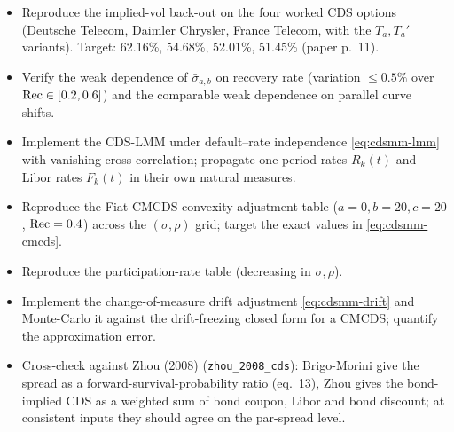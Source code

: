 \documentclass[11pt,a4paper]{article}
\begin{document}
\begin{todobox}
\begin{itemize}[noitemsep]
  \item Reproduce the implied-vol back-out on the four worked CDS
        options (Deutsche Telecom, Daimler Chrysler, France
        Telecom, with the $T_a, T_a'$ variants). Target: 62.16\%,
        54.68\%, 52.01\%, 51.45\% (paper p.~11).
  \item Verify the weak dependence of $\bar\sigma_{a,b}$ on recovery
        rate (variation $\le 0.5\%$ over $\mathrm{Rec} \in [0.2, 0.6]$) and
        the comparable weak dependence on parallel curve shifts.
  \item Implement the CDS-LMM under default--rate independence
        \eqref{eq:cdsmm-lmm} with vanishing cross-correlation;
        propagate one-period rates $R_k(t)$ and Libor rates $F_k(t)$
        in their own natural measures.
  \item Reproduce the Fiat CMCDS convexity-adjustment table
        ($a=0, b=20, c=20$, $\mathrm{Rec}=0.4$) across the
        $(\sigma, \rho)$ grid; target the exact values in
        \eqref{eq:cdsmm-cmcds}.
  \item Reproduce the participation-rate table (decreasing in
        $\sigma, \rho$).
  \item Implement the change-of-measure drift adjustment
        \eqref{eq:cdsmm-drift} and Monte-Carlo it against the
        drift-freezing closed form for a CMCDS; quantify the
        approximation error.
  \item Cross-check against Zhou (2008) (\texttt{zhou\_2008\_cds}):
        Brigo-Morini give the spread as a forward-survival-probability
        ratio (eq.~13), Zhou gives the bond-implied CDS as a
        weighted sum of bond coupon, Libor and bond discount; at
        consistent inputs they should agree on the par-spread level.
\end{itemize}
\end{todobox}
\end{document}
